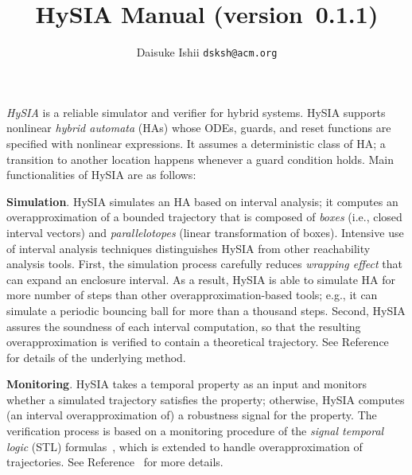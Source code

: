 \documentclass[12pt,a4paper]{article}
\begin{document}
\title{HySIA Manual (version~0.1.1)}
\author{Daisuke Ishii \quad \texttt{dsksh@acm.org}}

\maketitle

\setlength{\grammarparsep}{8pt plus 1pt minus 1pt} %
\setlength{\grammarindent}{8em} %

\emph{HySIA} is a reliable simulator and verifier for hybrid systems.
%
HySIA supports nonlinear \emph{hybrid automata} (HAs) whose ODEs, guards, and reset functions are specified with nonlinear expressions. It assumes a deterministic class of HA; a transition to another location happens whenever a guard condition holds.
%
Main functionalities of HySIA are as follows:

\textbf{Simulation}.
%
HySIA simulates an HA based on interval analysis;
it computes an overapproximation of a bounded trajectory that is composed of \emph{boxes} (i.e., closed interval vectors) and \emph{parallelotopes} (linear transformation of boxes).
%
Intensive use of interval analysis techniques distinguishes HySIA from other reachability analysis tools.
%
First, the simulation process carefully reduces \emph{wrapping effect} that can expand an enclosure interval. As a result, HySIA is able to simulate HA for more number of steps than other overapproximation-based tools; e.g., it can simulate a periodic bouncing ball for more than a thousand steps.
%
Second, HySIA assures the soundness of each interval computation, so that the resulting overapproximation is verified to contain a theoretical trajectory.
%
See Reference~\cite{GI2016} for details of the underlying method.

\textbf{Monitoring}.
%
HySIA takes a temporal property as an input and monitors whether a simulated trajectory satisfies the property; otherwise, HySIA computes (an interval overapproximation of) a robustness signal for the property.
The verification process is based on a monitoring procedure of the \emph{signal temporal logic} (STL) formulas~\cite{Maler2004}, which is extended to handle overapproximation of trajectories.
%
See Reference~\cite{Ishii2016IEICE} for more details.
\end{document}
